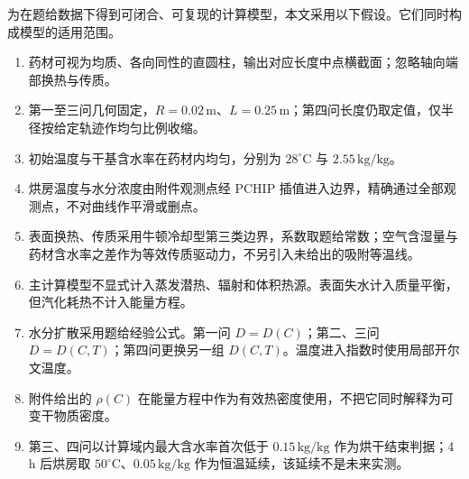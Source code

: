 为在题给数据下得到可闭合、可复现的计算模型，本文采用以下假设。它们同时构成模型的适用范围。

\begin{enumerate}
  \item 药材可视为均质、各向同性的直圆柱，输出对应长度中点横截面；忽略轴向端部换热与传质。
  \item 第一至三问几何固定，$R=0.02\,\mathrm{m}$、$L=0.25\,\mathrm{m}$；第四问长度仍取定值，仅半径按给定轨迹作均匀比例收缩。
  \item 初始温度与干基含水率在药材内均匀，分别为 $28^\circ\mathrm{C}$ 与 $2.55\,\mathrm{kg/kg}$。
  \item 烘房温度与水分浓度由附件观测点经 PCHIP 插值进入边界，精确通过全部观测点，不对曲线作平滑或删点。
  \item 表面换热、传质采用牛顿冷却型第三类边界，系数取题给常数；空气含湿量与药材含水率之差作为等效传质驱动力，不另引入未给出的吸附等温线。
  \item 主计算模型不显式计入蒸发潜热、辐射和体积热源。表面失水计入质量平衡，但汽化耗热不计入能量方程。
  \item 水分扩散采用题给经验公式。第一问 $D=D(C)$；第二、三问 $D=D(C,T)$；第四问更换另一组 $D(C,T)$。温度进入指数时使用局部开尔文温度。
  \item 附件给出的 $\rho(C)$ 在能量方程中作为有效热密度使用，不把它同时解释为可变干物质密度。
  \item 第三、四问以计算域内最大含水率首次低于 $0.15\,\mathrm{kg/kg}$ 作为烘干结束判据；4\,h 后烘房取 $50^\circ\mathrm{C}$、$0.05\,\mathrm{kg/kg}$ 作为恒温延续，该延续不是未来实测。
\end{enumerate}
